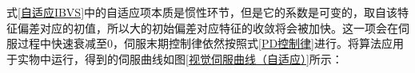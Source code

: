 \documentclass[fontset=fandol,type=bachelor,campus=harbin,bsmainpagenumberline=true]{hithesisbook}
\begin{document}
式\ref{自适应IBVS}中的自适应项本质是惯性环节，但是它的系数是可变的，取自该特征偏差对应的初值，所以大的初始偏差对应特征的收敛将会被加快。这一项会在伺服过程中快速衰减至0，伺服末期控制律依然按照式\ref{PD控制律}进行。将算法应用于实物中运行，得到的伺服曲线如图\ref{视觉伺服曲线（自适应）}所示：
\begin{figure}[h]
	\centering
\end{figure}
\end{document}
